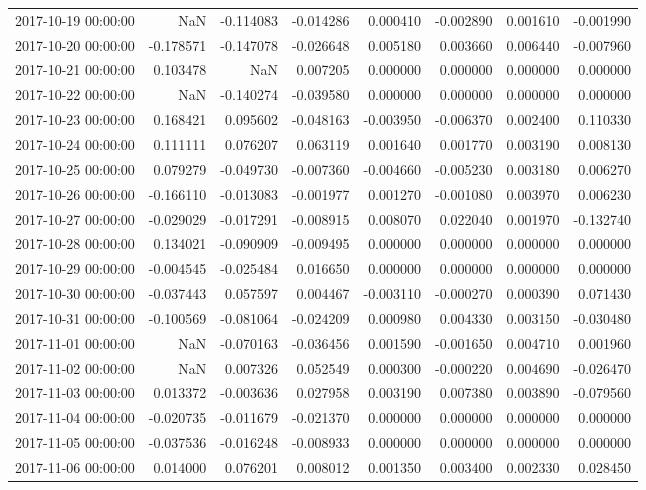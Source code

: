 \begin{tabular}{lrrrrrrr}
2017-10-19 00:00:00 & NaN & -0.114083 & -0.014286 & 0.000410 & -0.002890 & 0.001610 & -0.001990 \\
2017-10-20 00:00:00 & -0.178571 & -0.147078 & -0.026648 & 0.005180 & 0.003660 & 0.006440 & -0.007960 \\
2017-10-21 00:00:00 & 0.103478 & NaN & 0.007205 & 0.000000 & 0.000000 & 0.000000 & 0.000000 \\
2017-10-22 00:00:00 & NaN & -0.140274 & -0.039580 & 0.000000 & 0.000000 & 0.000000 & 0.000000 \\
2017-10-23 00:00:00 & 0.168421 & 0.095602 & -0.048163 & -0.003950 & -0.006370 & 0.002400 & 0.110330 \\
2017-10-24 00:00:00 & 0.111111 & 0.076207 & 0.063119 & 0.001640 & 0.001770 & 0.003190 & 0.008130 \\
2017-10-25 00:00:00 & 0.079279 & -0.049730 & -0.007360 & -0.004660 & -0.005230 & 0.003180 & 0.006270 \\
2017-10-26 00:00:00 & -0.166110 & -0.013083 & -0.001977 & 0.001270 & -0.001080 & 0.003970 & 0.006230 \\
2017-10-27 00:00:00 & -0.029029 & -0.017291 & -0.008915 & 0.008070 & 0.022040 & 0.001970 & -0.132740 \\
2017-10-28 00:00:00 & 0.134021 & -0.090909 & -0.009495 & 0.000000 & 0.000000 & 0.000000 & 0.000000 \\
2017-10-29 00:00:00 & -0.004545 & -0.025484 & 0.016650 & 0.000000 & 0.000000 & 0.000000 & 0.000000 \\
2017-10-30 00:00:00 & -0.037443 & 0.057597 & 0.004467 & -0.003110 & -0.000270 & 0.000390 & 0.071430 \\
2017-10-31 00:00:00 & -0.100569 & -0.081064 & -0.024209 & 0.000980 & 0.004330 & 0.003150 & -0.030480 \\
2017-11-01 00:00:00 & NaN & -0.070163 & -0.036456 & 0.001590 & -0.001650 & 0.004710 & 0.001960 \\
2017-11-02 00:00:00 & NaN & 0.007326 & 0.052549 & 0.000300 & -0.000220 & 0.004690 & -0.026470 \\
2017-11-03 00:00:00 & 0.013372 & -0.003636 & 0.027958 & 0.003190 & 0.007380 & 0.003890 & -0.079560 \\
2017-11-04 00:00:00 & -0.020735 & -0.011679 & -0.021370 & 0.000000 & 0.000000 & 0.000000 & 0.000000 \\
2017-11-05 00:00:00 & -0.037536 & -0.016248 & -0.008933 & 0.000000 & 0.000000 & 0.000000 & 0.000000 \\
2017-11-06 00:00:00 & 0.014000 & 0.076201 & 0.008012 & 0.001350 & 0.003400 & 0.002330 & 0.028450 \\

\end{tabular}
